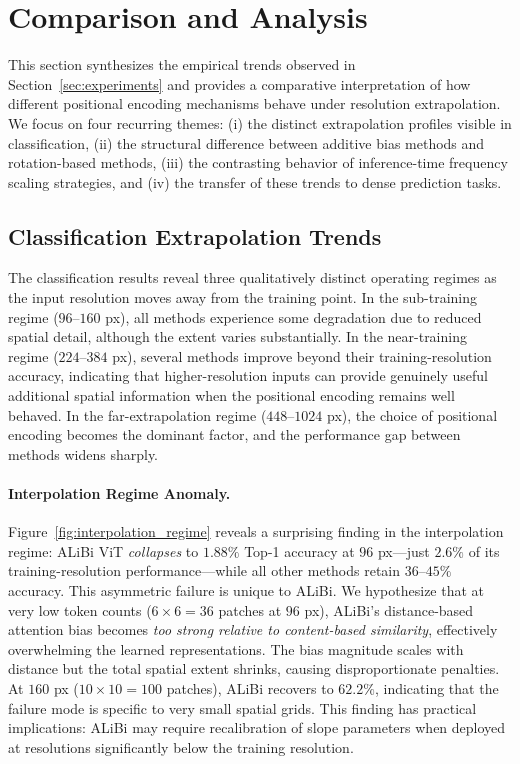 \section{Comparison and Analysis}
\label{sec:analysis}

This section synthesizes the empirical trends observed in Section~\ref{sec:experiments} and
provides a comparative interpretation of how different positional encoding mechanisms behave under
resolution extrapolation. We focus on four recurring themes: (i) the distinct extrapolation
profiles visible in classification, (ii) the structural difference between additive bias methods
and rotation-based methods, (iii) the contrasting behavior of inference-time frequency scaling
strategies, and (iv) the transfer of these trends to dense prediction tasks.

\subsection{Classification Extrapolation Trends}

The classification results reveal three qualitatively distinct operating regimes as the input
resolution moves away from the training point. In the sub-training regime ($96$--$160$ px), all
methods experience some degradation due to reduced spatial detail, although the extent varies
substantially. In the near-training regime ($224$--$384$ px), several methods improve beyond their
training-resolution accuracy, indicating that higher-resolution inputs can provide genuinely useful
additional spatial information when the positional encoding remains well behaved. In the
far-extrapolation regime ($448$--$1024$ px), the choice of positional encoding becomes the dominant
factor, and the performance gap between methods widens sharply.

\paragraph{Interpolation Regime Anomaly.}
Figure~\ref{fig:interpolation_regime} reveals a surprising finding in the interpolation regime:
ALiBi ViT \emph{collapses} to $1.88\%$ Top-1 accuracy at $96$ px---just $2.6\%$ of its training-resolution
performance---while all other methods retain $36$--$45\%$ accuracy. This asymmetric failure is unique
to ALiBi. We hypothesize that at very low token counts ($6 \times 6 = 36$ patches at $96$ px), ALiBi's
distance-based attention bias becomes \emph{too strong relative to content-based similarity},
effectively overwhelming the learned representations. The bias magnitude scales with distance but
the total spatial extent shrinks, causing disproportionate penalties. At $160$ px ($10 \times 10 = 100$ patches),
ALiBi recovers to $62.2\%$, indicating that the failure mode is specific to very small spatial grids.
This finding has practical implications: ALiBi may require recalibration of slope parameters when deployed at resolutions significantly below the training resolution.

